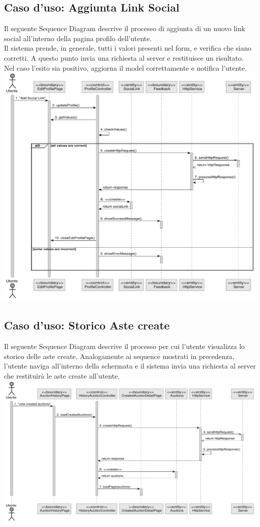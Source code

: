 \subsection{Caso d'uso: Aggiunta Link Social}
Il seguente Sequence Diagram descrive il processo di aggiunta di un nuovo link social all'interno della pagina profilo dell'utente.
\\ Il sistema prende, in generale, tutti i valori presenti nel form, e verifica che siano corretti. A questo punto invia una richiesta al server e restituisce un risultato. Nel caso l'esito sia positivo, aggiorna il model correttamente e notifica l'utente. 
\\
\includegraphics[width=\textwidth]{assets/sequence/aggiungere_link_social.pdf}

\pagebreak
\subsection{Caso d'uso: Storico Aste create}
Il seguente Sequence Diagram descrive il processo per cui l'utente visualizza lo storico delle aste create. Analogamente ai sequence mostrati in precedenza, l'utente naviga all'interno della schermata e il sistema invia una richiesta al server che restituirà le aste create all'utente. 
\\
\includegraphics[width=\textwidth]{assets/sequence/visualizzazione_storico_aste_ancora_attive.pdf}
